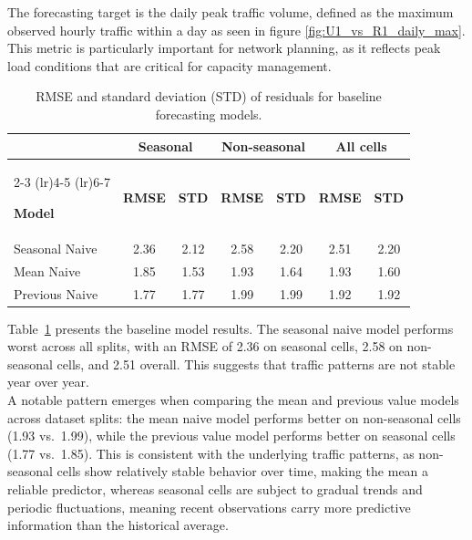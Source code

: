 The forecasting target is the daily peak traffic volume, defined as the maximum observed hourly traffic within a day as seen in figure \ref{fig:U1_vs_R1_daily_max}. This metric is particularly important for network planning, as it reflects peak load conditions that are critical for capacity management. \\

\begin{table}[htbp]
	\centering
	
	\begin{tabular}{lcccccc}
		\toprule
		& \multicolumn{2}{c}{\textbf{Seasonal}} 
		& \multicolumn{2}{c}{\textbf{Non-seasonal}} 
		& \multicolumn{2}{c}{\textbf{All cells}} \\
		
		\cmidrule(lr){2-3}
		\cmidrule(lr){4-5}
		\cmidrule(lr){6-7}
		
		\textbf{Model} 
		& \textbf{RMSE} & \textbf{STD}
		& \textbf{RMSE} & \textbf{STD}
		& \textbf{RMSE} & \textbf{STD} \\
		
		\midrule
		
		Seasonal Naive 
		& 2.36 & 2.12
		& 2.58 & 2.20
		& 2.51 & 2.20 \\
		
		Mean Naive     
		& 1.85 & 1.53
		& 1.93 & 1.64
		& 1.93 & 1.60 \\
		
		Previous Naive 
		& 1.77 & 1.77
		& 1.99 & 1.99
		& 1.92 & 1.92 \\
		
		\bottomrule
	\end{tabular}
	\caption{RMSE and standard deviation (STD) of residuals for baseline forecasting models.}
	\label{tab:baseline_models}
\end{table}

Table~\ref{tab:baseline_models} presents the baseline model results. The seasonal naive model performs worst across all splits, with an RMSE of 2.36 on seasonal cells, 2.58 on non-seasonal cells, and 2.51 overall. This suggests that traffic patterns are not stable year over year. \\

A notable pattern emerges when comparing the mean and previous value models across dataset splits: the mean naive model performs better on non-seasonal cells (1.93 vs.\ 1.99), while the previous value model performs better on seasonal cells (1.77 vs.\ 1.85). This is consistent with the underlying traffic patterns, as non-seasonal cells show relatively stable behavior over time, making the mean a reliable predictor, whereas seasonal cells are subject to gradual trends and periodic fluctuations, meaning recent observations carry more predictive information than the historical average. \\


